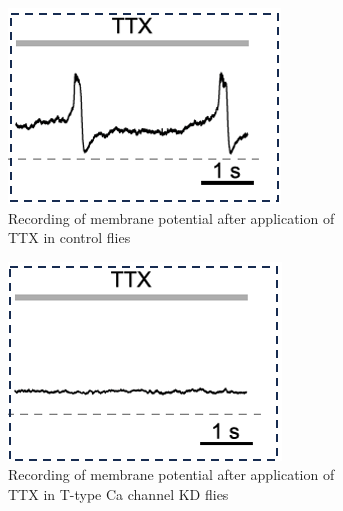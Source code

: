 \documentclass[11pt]{article}
\begin{document}
\begin{itemize}
    \begin{figure}[H]
        \centering
        \begin{subfigure}[t]{0.45\textwidth}
            \centering
            \includegraphics[width=\textwidth]{./img/2025_01_23/control_ttx.png}
            \caption{Recording of membrane potential after application of TTX in control flies}
            \label{fig_ttx_control}
        \end{subfigure}
        \hfill
        \begin{subfigure}[t]{0.45\textwidth}
            \centering
            \includegraphics[width=\textwidth]{./img/2025_01_23/t_type_KD.png}
            \caption{Recording of membrane potential after application of TTX in T-type Ca channel KD flies}
            \label{fig_ttx_t_kd}
        \end{subfigure}
        \caption{}
    \end{figure}
\end{itemize}
\end{document}

